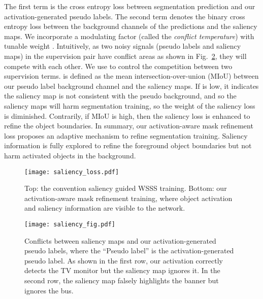 \documentclass[10pt,twocolumn,letterpaper]{article}
\begin{document}
The first term  is the cross entropy loss between segmentation prediction and our activation-generated pseudo labels.
The second term  denotes the binary cross entropy loss between the background channels of the predictions and the saliency maps.
We incorporate a modulating factor  (called the \emph{conflict temperature}) with tunable weight .
Intuitively, as two noisy signals (pseudo labels and saliency maps) in the supervision pair have conflict areas as shown in Fig.~\ref{saliency_fig}, they will compete with each other.
We use  to control the competition between two supervision terms.  is
defined as the mean intersection-over-union (MIoU) between our pseudo label background channel and 
the saliency maps.
If   is
low, it indicates the saliency map is not consistent with the pseudo background, and so the saliency maps will harm  segmentation training,
so the weight of the saliency loss  is diminished. 
Contrarily, if MIoU is high, then the saliency loss is enhanced to refine the object boundaries.
In summary, our activation-aware mask refinement loss proposes an adaptive mechanism to refine segmentation training.
Saliency information is fully explored to refine the foreground object boundaries but not harm activated objects in the background.


\begin{figure}[!t]
   \begin{center}
   {\texttt{[image: saliency\_loss.pdf]}}
   \end{center}
\caption{Top: the convention saliency guided WSSS training.
Bottom: our activation-aware mask refinement training, where object activation and saliency information are visible to the network.
}
\vspace{-2mm}
   \label{fig: saliency model}
\end{figure}


\begin{figure}[!htb]
   \begin{center}
   {\texttt{[image: saliency\_fig.pdf]}}
   \end{center}
\caption{Conflicts between saliency maps and our activation-generated pseudo labels, where the \enquote{Pseudo label} is the
activation-generated pseudo label.
As shown in the first row, our activation correctly detects the TV monitor but the saliency map 
ignores it.
In the second row, the saliency map falsely highlights the banner but ignores the bus.}
   \label{saliency_fig}
\end{figure}
\end{document}
